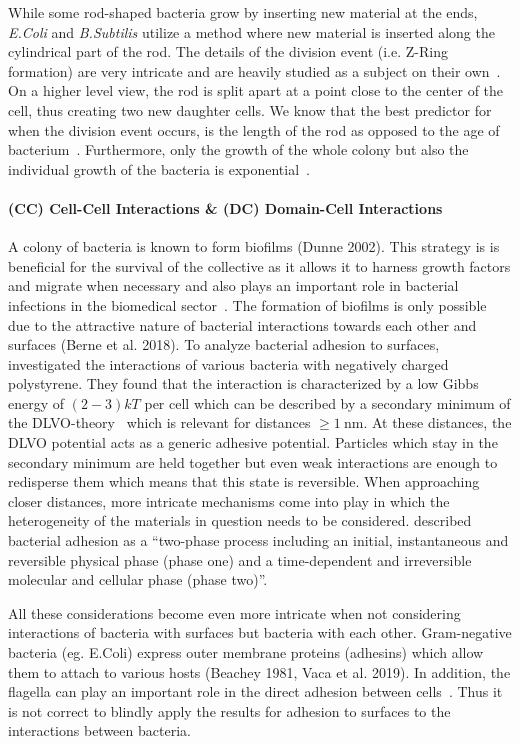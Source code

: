 \documentclass{article}
\begin{document}
While some rod-shaped bacteria grow by inserting new material at the ends, \textit{E.Coli} and
\textit{B.Subtilis} utilize a method where new material is inserted along the cylindrical part of
the rod.
The details of the division event (i.e. Z-Ring formation) are very intricate and are heavily
studied as a subject on their own~\cite{Harry2001}.
On a higher level view, the rod is split apart at a point close to the center of the cell, thus
creating two new daughter cells.
We know that the best predictor for when the division event occurs, is the length of the rod as
opposed to the age of bacterium~\cite{Robert2014}.
Furthermore, only the growth of the whole colony but also the individual growth of the bacteria is
exponential~\cite{Amir2014,Takeuchi2005}.

\paragraph{(CC) Cell-Cell Interactions \& (DC) Domain-Cell Interactions}
A colony of bacteria is known to form biofilms (Dunne 2002). This strategy is is beneficial for the
survival of the collective as it allows it to harness growth factors and migrate when necessary and
also plays an important role in bacterial infections in the biomedical sector~\cite{Ong1999}.
The formation of biofilms is only possible due to the attractive nature of bacterial interactions
towards each other and surfaces (Berne et al. 2018). To analyze bacterial adhesion to surfaces,
\cite{vanLoosdrecht1989} investigated the interactions of various bacteria with negatively charged
polystyrene.
They found that the interaction is characterized by a low Gibbs energy of $(2 - 3)kT$ per cell
which can be described by a secondary minimum of the DLVO-theory~\cite{Verwey1947,Derjaguin1993}
which is relevant for distances $\geq\SI{1}{\nano\meter}$.
At these distances, the DLVO potential acts as a generic adhesive potential.
Particles which stay in the secondary minimum are held together but even weak interactions are
enough to redisperse them which means that this state is reversible.
When approaching closer distances, more intricate mechanisms come into play in which the
heterogeneity of the materials in question needs to be considered.
\cite{Hori2010} described bacterial adhesion as a “two-phase process including an initial,
instantaneous and reversible physical phase (phase one) and a time-dependent and irreversible
molecular and cellular phase (phase two)”.

All these considerations become even more intricate when not considering interactions of bacteria
with surfaces but bacteria with each other.
Gram-negative bacteria (eg. E.Coli) express outer membrane proteins (adhesins) which allow them to
attach to various hosts (Beachey 1981, Vaca et al. 2019).
In addition, the flagella can play an important role in the direct adhesion between
cells~\cite{Haiko2013}.
Thus it is not correct to blindly apply the results for adhesion to surfaces to the interactions
between bacteria.
\end{document}
